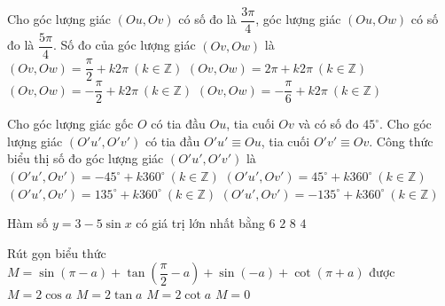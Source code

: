 \begin{ex}%
    Cho góc lượng giác $(Ou,Ov)$ có số đo là $\dfrac{3\pi}{4}$, góc lượng giác $(Ou,Ow)$ có số đo là $\dfrac{5\pi}{4}$. Số đo của góc lượng giác $(Ov,Ow)$ là
\choice
{\True $(Ov,Ow)=\dfrac{\pi}{2}+k2\pi\ (k\in \mathbb{Z})$}
{$(Ov,Ow)=2\pi+k2\pi\ (k\in \mathbb{Z})$}
{$(Ov,Ow)=-\dfrac{\pi}{2}+k2\pi\ (k\in \mathbb{Z})$}
{$(Ov,Ow)=-\dfrac{\pi}{6}+k2\pi\ (k\in \mathbb{Z})$}
\end{ex}

\begin{ex}%
    Cho góc lượng giác gốc $O$ có tia đầu $Ou$, tia cuối $Ov$ và có số đo $45^\circ$. Cho góc lượng giác $(O'u',O'v')$ có tia đầu $O'u'\equiv Ou$, tia cuối $O'v'\equiv Ov$. Công thức biểu thị số đo góc lượng giác $(O'u',O'v')$ là
\choice
{$(O'u',Ov')=-45^\circ+k360^\circ\ (k\in \mathbb{Z})$}
{\True $(O'u',Ov')=45^\circ+k360^\circ\ (k\in \mathbb{Z})$}
{$(O'u',Ov')=135^\circ+k360^\circ\ (k\in \mathbb{Z})$}
{$(O'u',Ov')=-135^\circ+k360^\circ\ (k\in \mathbb{Z})$}
\end{ex}

\begin{ex}%
        Hàm số $y=3-5\sin x$ có giá trị lớn nhất bằng
        \choice
        {$6$}
        {$2$}
        {\True $8$}
        {$4$}
    \end{ex}

\begin{ex}%
        Rút gọn biểu thức $M=\sin(\pi-a)+\tan\left(\dfrac{\pi}{2}-a\right)+\sin(-a)+\cot(\pi+a)$ được
        \choice
        {$M=2\cos a$}
        {$M=2\tan a$}
        {\True $M=2\cot a$}
        {$M=0$}
    \end{ex}

